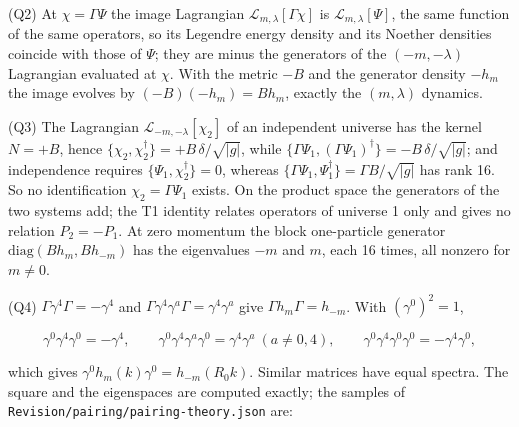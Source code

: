 \documentclass[11pt]{article}
\begin{document}
(Q2) At $\chi = \Gamma\Psi$ the image Lagrangian $\mathcal{L}_{m,\lambda}[\Gamma\chi]$ is $\mathcal{L}_{m,\lambda}[\Psi]$, the same function of the same operators, so its Legendre energy density and its Noether densities coincide with those of $\Psi$; they are minus the generators of the $(-m,-\lambda)$ Lagrangian evaluated at $\chi$. With the metric $-B$ and the generator density $-h_m$ the image evolves by $(-B)(-h_m) = Bh_m$, exactly the $(m,\lambda)$ dynamics.

(Q3) The Lagrangian $\mathcal{L}_{-m,-\lambda}[\chi_2]$ of an independent universe has the kernel $N = +B$, hence $\{\chi_2, \chi_2^\dagger\} = +B\,\delta/\sqrt{|g|}$, while $\{\Gamma\Psi_1, (\Gamma\Psi_1)^\dagger\} = -B\,\delta/\sqrt{|g|}$; and independence requires $\{\Psi_1, \chi_2^\dagger\} = 0$, whereas $\{\Gamma\Psi_1, \Psi_1^\dagger\} = \Gamma B/\sqrt{|g|}$ has rank 16. So no identification $\chi_2 = \Gamma\Psi_1$ exists. On the product space the generators of the two systems add; the T1 identity relates operators of universe 1 only and gives no relation $P_2 = -P_1$. At zero momentum the block one-particle generator $\mathrm{diag}(Bh_m, Bh_{-m})$ has the eigenvalues $-m$ and $m$, each 16 times, all nonzero for $m \neq 0$.

(Q4) $\Gamma\gamma^4\Gamma = -\gamma^4$ and $\Gamma\gamma^4\gamma^a\Gamma = \gamma^4\gamma^a$ give $\Gamma h_m\Gamma = h_{-m}$. With $(\gamma^0)^2 = 1$,

\[
\gamma^0\gamma^4\gamma^0 = -\gamma^4,\qquad
\gamma^0\gamma^4\gamma^a\gamma^0 = \gamma^4\gamma^a \ (a \neq 0, 4),\qquad
\gamma^0\gamma^4\gamma^0\gamma^0 = -\gamma^4\gamma^0 ,
\]

which gives $\gamma^0h_m(k)\gamma^0 = h_{-m}(R_0k)$. Similar matrices have equal spectra. The square and the eigenspaces are computed exactly; the samples of \texttt{Revision\allowbreak{}/pairing\allowbreak{}/pairing\allowbreak{}-theory.\allowbreak{}json} are:
\end{document}
